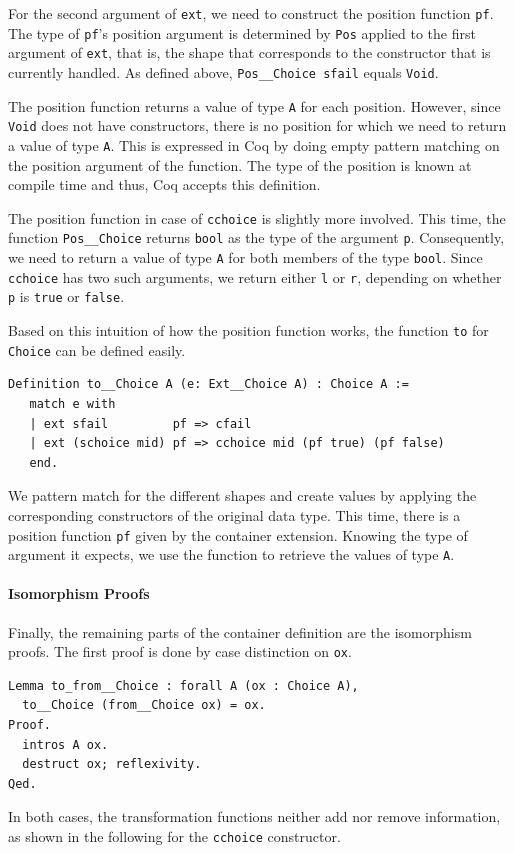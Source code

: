 \documentclass[a4paper, 11pt, fleqn, twoside, abstract=on]{scrreprt}
\newcommand{\cinl}[1]{\texttt{#1}}
\begin{document}
For the second argument of \cinl{ext}, we need to construct the position function \cinl{pf}.
The type of \cinl{pf}'s position argument is determined by \cinl{Pos} applied to the first argument of \cinl{ext}, that is, the shape that corresponds to the constructor that is currently handled.
As defined above, \cinl{Pos__Choice sfail} equals \cinl{Void}.

The position function returns a value of type \cinl{A} for each position.
However, since \cinl{Void} does not have constructors, there is no position for which we need to return a value of type \cinl{A}. 
This is expressed in Coq by doing empty pattern matching on the position argument of the function.
The type of the position is known at compile time and thus, Coq accepts this definition.

The position function in case of \cinl{cchoice} is slightly more involved.
This time, the function \cinl{Pos__Choice} returns \cinl{bool} as the type of the argument \cinl{p}.
Consequently, we need to return a value of type \cinl{A} for both members of the type \cinl{bool}.
Since \cinl{cchoice} has two such arguments, we return either \cinl{l} or \cinl{r}, depending on whether \cinl{p} is \cinl{true} or \cinl{false}.

Based on this intuition of how the position function works, the function \cinl{to} for \cinl{Choice} can be defined easily.

\begin{verbatim}
Definition to__Choice A (e: Ext__Choice A) : Choice A :=
   match e with
   | ext sfail         pf => cfail
   | ext (schoice mid) pf => cchoice mid (pf true) (pf false)
   end.
\end{verbatim}
\noindent
We pattern match for the different shapes and create values by applying the corresponding constructors of the original data type.
This time, there is a position function \cinl{pf} given by the container extension.
Knowing the type of argument it expects, we use the function to retrieve the values of type \cinl{A}.

\paragraph{Isomorphism Proofs}
Finally, the remaining parts of the container definition are the isomorphism proofs.
The first proof is done by case distinction on \cinl{ox}.

\begin{verbatim}
Lemma to_from__Choice : forall A (ox : Choice A),
  to__Choice (from__Choice ox) = ox.
Proof.
  intros A ox.
  destruct ox; reflexivity.
Qed.
\end{verbatim}
\noindent
In both cases, the transformation functions neither add nor remove information, as shown in the following for the \cinl{cchoice} constructor.
\end{document}
